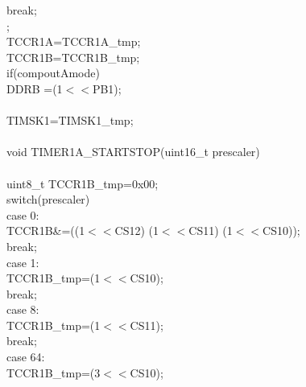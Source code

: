 \documentclass[titlepage, a4paper, 10pt, reqno, openany]{report}
\begin{document}
\begin{minipage}[t]{.35\linewidth}
\hspace*{1.5cm}			break; \\
\hspace*{.5cm}	\textbraceright ; \\
\hspace*{.5cm}	TCCR1A=TCCR1A\_tmp; \\
\hspace*{.5cm}	TCCR1B=TCCR1B\_tmp; \\
\hspace*{.5cm}	if(compoutAmode)\textbraceleft \\
\hspace*{1cm}		DDRB \textbar =(1$<<$PB1); \\
\hspace*{.5cm}	\textbraceright \\
\hspace*{.5cm}	TIMSK1=TIMSK1\_tmp; \\
\textbraceright \\
void TIMER1A\_STARTSTOP(uint16\_t prescaler) \\
\textbraceleft \\
\hspace*{.5cm}	uint8\_t TCCR1B\_tmp=0x00; \\
\hspace*{.5cm}	switch(prescaler)\textbraceleft \\
\hspace*{1cm}		case 0: \\
\hspace*{1.5cm}			TCCR1B\&=\texttildelow ((1$<<$CS12) \textbar (1$<<$CS11) \textbar (1$<<$CS10)); \\
\hspace*{1.5cm}			break; \\
\hspace*{1cm}		case 1: \\
\hspace*{1.5cm}			TCCR1B\_tmp=(1$<<$CS10); \\
\hspace*{1.5cm}			break; \\
\hspace*{1cm}		case 8: \\
\hspace*{1.5cm}			TCCR1B\_tmp=(1$<<$CS11); \\
\hspace*{1.5cm}			break; \\
\hspace*{1cm}		case 64: \\
\hspace*{1.5cm}			TCCR1B\_tmp=(3$<<$CS10); \\

\end{minipage}
\end{document}
